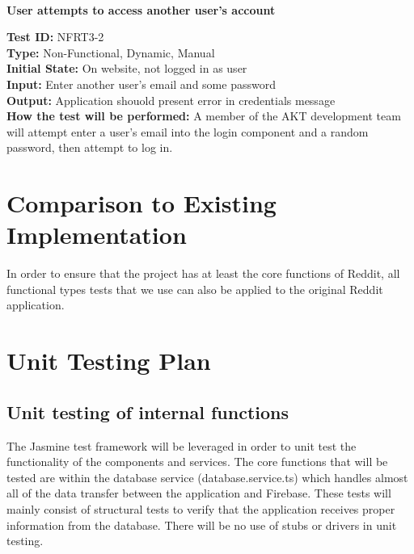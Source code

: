 \documentclass[12pt,fleqn]{article}
\begin{document}
\newpage

\textbf{\\User attempts to access another user's account}
\begin{tcolorbox}
\textbf{Test ID:} NFRT3-2\\
\textbf{Type:} Non-Functional, Dynamic, Manual\\
\textbf{Initial State:} On website, not logged in as user \\
\textbf{Input:} Enter another user's email and some password \\
\textbf{Output:} Application shouold present error in credentials message\\
\textbf{How the test will be performed:} A member of the AKT development team will attempt enter a user's email into the login component and a random password, then attempt to log in.
\end{tcolorbox}

\section{Comparison to Existing Implementation}
In order to ensure that the project has at least the core functions of Reddit, all functional types tests that we use can also be applied to the original Reddit application.

\section{Unit Testing Plan}
\subsection{Unit testing of internal functions}
The Jasmine test framework will be leveraged in order to unit test the functionality of the components and services. The core functions that will be tested are within the database service (database.service.ts) which handles almost all of the data transfer between the application and Firebase. These tests will mainly consist of structural tests to verify that the application receives proper information from the database. There will be no use of stubs or drivers in unit testing.
\end{document}
